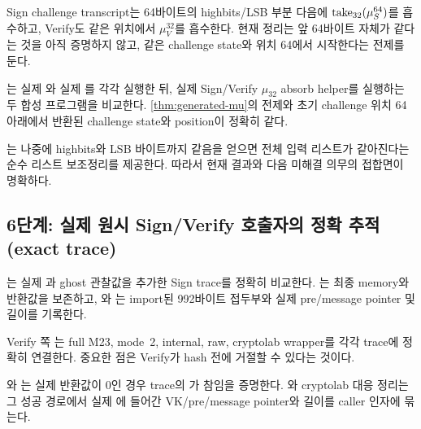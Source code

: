 Sign challenge transcript는 64바이트의 highbits/LSB 부분 다음에
\(\mathop{\mathrm{take}}_{32}(\mu_S^{64})\)를 흡수하고, Verify도 같은 위치에서
\(\mu_V^{32}\)를 흡수한다. 현재 정리는 앞 64바이트 자체가 같다는 것을 아직
증명하지 않고, 같은 challenge state와 위치 64에서 시작한다는 전제를 둔다.

\begin{verified}
\label{thm:challenge-suffix}
는
실제 와 실제
를 각각 실행한 뒤, 실제 Sign/Verify
\(\mu_{32}\) absorb helper를 실행하는 두 합성 프로그램을 비교한다.
\cref{thm:generated-mu}의 전제와 초기 challenge 위치 64 아래에서 반환된
challenge state와 position이 정확히 같다.
\end{verified}

는 나중에 highbits와
LSB 바이트까지 같음을 얻으면 전체 입력 리스트가 같아진다는 순수 리스트
보조정리를 제공한다. 따라서 현재 결과와 다음 미해결 의무의 접합면이 명확하다.

\subsection{6단계: 실제 원시 Sign/Verify 호출자의 정확 추적(exact trace)}

는 실제
과 ghost 관찰값을 추가한
Sign trace를 정확히 비교한다. 는 최종
memory와 반환값을 보존하고,
와
는 import된 992바이트 접두부와
실제 pre/message pointer 및 길이를 기록한다.

Verify 쪽 는 full M23, mode~2, internal,
raw, cryptolab wrapper를 각각 trace에 정확히 연결한다. 중요한 점은 Verify가
hash 전에 거절할 수 있다는 것이다.

\begin{verified}
\label{thm:verify-accept-tail}
와
는 실제
반환값이 0인 경우 trace의 가 참임을 증명한다.
와 cryptolab 대응
정리는 그 성공 경로에서 실제 에 들어간
VK/pre/message pointer와 길이를 caller 인자에 묶는다.
\end{verified}

